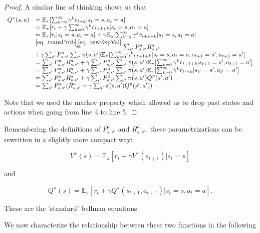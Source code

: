 \documentclass[11pt]{article} %
\begin{document}
\begin{proof}
A similar line of thinking shows us that
	\[
		\begin{array}{rl}
			Q^{\pi}(s,a)	& = \mathbb{E}_{\pi}[\sum_{k=0}^{\infty} \gamma^k r_{t+k} | s_t = s, a_t = a]  \\
						& = \mathbb{E}_{\pi}[r_t + \gamma \sum_{k=0}^{\infty} \gamma^k r_{t+1+k} | s_t = s, a_t = a]  \\
						& = \mathbb{E}_{\pi}[r_t | s_t = s, a_t = a] + \gamma \mathbb{E}_{\pi}[ \sum_{k=0}^{\infty} \gamma^k r_{t+1+k} | s_t = s, a_t = a] \\
						& \overset{\ref{eq_transProb},\ref{eq_rewExpVal}}{=} \sum_{s'} P_{s,s'}^a R_{s,s'}^a \\
						& + \gamma \sum_{s'} P_{s,s'}^a \sum_{a'} \pi(s,a') \mathbb{E}_{\pi}[\sum_{k=0}^{\infty} \gamma^k r_{t+1+k} | s_t = s, a_t = a, s_{t+1} = s', a_{t+1} = a'] \\
						& = \sum_{s'} P_{s,s'}^a R_{s,s'}^a + \gamma \sum_{s'} P_{s,s'}^a \sum_{a'} \pi(s,a') \mathbb{E}_{\pi}[\sum_{k=0}^{\infty} \gamma^k r_{t+1+k} | s_{t+1} = s', a_{t+1} = a'] \\
						& = \sum_{s'} P_{s,s'}^a R_{s,s'}^a + \gamma \sum_{s'} P_{s,s'}^a \sum_{a'} \pi(s,a') \mathbb{E}_{\pi}[\sum_{k=0}^{\infty} \gamma^k r_{t'+k} | s_{t'} = s', a_{t'} = a'] \\
						& = \sum_{s'} P_{s,s'}^a R_{s,s'}^a + \gamma \sum_{s'} P_{s,s'}^a \sum_{a'} \pi(s,a') Q^{\pi}(s',a') \\
						& = \sum_{s'} P_{s,s'}^a ( R_{s,s'}^a + \gamma \sum_{a'} \pi(s,a') Q^{\pi}(s',a') )  \\
		\end{array}
	\]

Note that we used the markov property which allowed us to drop past states and actions when going from line 4 to line 5.

\end{proof}

Remembering the definitions of $P_{s,s'}^a$ and $R_{s,s'}^a$, these parametrizations can be rewritten in a slightly more compact way:

$$ V^{\pi}(s) =  \mathbb{E}_{\pi}[r_t + \gamma V^{\pi}(s_{t+1}) | s_t = s ] $$

and 

$$ Q^{\pi}(s) = \mathbb{E}_{\pi}[r_t + \gamma Q^{\pi}(s_{t+1},a_{t+1}) | s_t = s, a_t = a]. $$

These are the 'standard' bellman equations.

We now characterize the relationship between these two functions in the following
\end{document}
